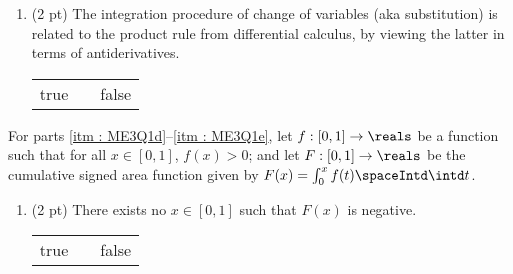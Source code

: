 


\begin{enumerate}[resume,label=(\alph*)]
\item\label{itm : ME3Q1c} (2 pt) The integration procedure of change of variables (aka substitution) is related to the product rule from differential calculus, by viewing the latter in terms of antiderivatives.
\begin{center}
\begin{tabular}{c c c}
true	&	\hspace{1in}	&	false
\end{tabular}
\end{center}
\end{enumerate}




\vspace{0.25in}%

\noindent{}For parts \ref{itm : ME3Q1d}--\ref{itm : ME3Q1e}, let $f : [0,1] \rightarrow \reals$ be a function such that for all $x \in [0,1]$, $f(x) > 0$; and let $F : [0,1] \rightarrow \reals$ be the cumulative signed area function given by $F(x) = \int_{0}^{x} f(t) \spaceIntd \intd t$.



\begin{enumerate}[resume,label=(\alph*)]
\item\label{itm : ME3Q1d} (2 pt) There exists no $x \in [0,1]$ such that $F(x)$ is negative.
\begin{center}
\begin{tabular}{c c c}
true	&	\hspace{1in}	&	false
\end{tabular}
\end{center}
\end{enumerate}


